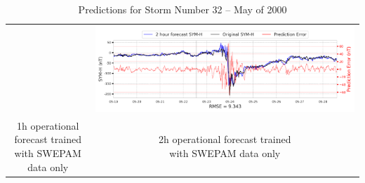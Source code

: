 \documentclass[draft,sw]{agutexSI2019}
\begin{document}
\begin{table}
\begin{tabular}{cc}
&
\includegraphics[width=0.49\linewidth]{paper_plots_shade/2h_swepam_rt/2h_swepam_rt_storm_32.png}
\\
\shortstack{1h operational forecast trained\\ with SWEPAM data only} & \shortstack{2h operational forecast trained\\ with SWEPAM data only}
\vspace*{12pt}
\\
\end{tabular}
\caption{Predictions for Storm Number 32 -- May of 2000}
\label{storm-32}
\end{table}
\end{document}

